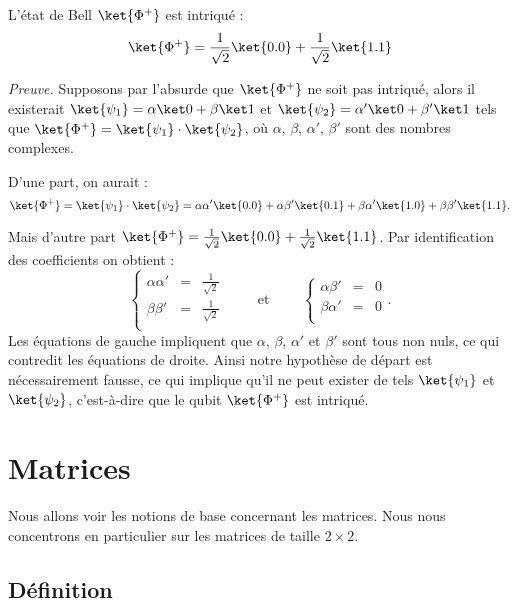 \documentclass[11pt,class=report,crop=false]{standalone}
\begin{document}
\begin{exemple}
L'état de Bell $\ket{\Phi^+}$ est intriqué :
$$\ket{\Phi^+} = \frac1{\sqrt2} \ket{0.0} + \frac1{\sqrt2} \ket{1.1}$$


\emph{Preuve.} Supposons par l'absurde que $\ket{\Phi^+}$ ne soit pas intriqué, alors il existerait 
$\ket{\psi_1}=\alpha\ket0+\beta\ket1$
et $\ket{\psi_2}=\alpha'\ket0+\beta'\ket1$
tels que $\ket{\Phi^+} = \ket{\psi_1} \cdot \ket{\psi_2}$, où $\alpha$, $\beta$, $\alpha'$, $\beta'$ sont des nombres complexes.

D'une part, on aurait :
$$\ket{\Phi^+} 
= \ket{\psi_1} \cdot \ket{\psi_2}
= \alpha\alpha'\ket{0.0} + \alpha\beta'\ket{0.1}
+ \beta\alpha'\ket{1.0} + \beta\beta'\ket{1.1} 
.$$

Mais d'autre part $\ket{\Phi^+} = \frac1{\sqrt2} \ket{0.0} + \frac1{\sqrt2} \ket{1.1}$.
Par identification des coefficients on obtient :
$$
\left\{\begin{array}{rcl}
\alpha\alpha' &=& \frac1{\sqrt2} \\
\beta\beta'&=& \frac1{\sqrt2}\\
\end{array}\right.
\qquad \text{ et   } \qquad
\left\{\begin{array}{rcl}
\alpha\beta'&=&0\\
\beta\alpha'&=&0\\
\end{array}\right..$$
Les équations de gauche impliquent que $\alpha$, $\beta$, $\alpha'$ et $\beta'$ sont tous non nuls, ce qui contredit les équations de droite.
Ainsi notre hypothèse de départ est nécessairement fausse, ce qui implique qu'il ne peut exister de tels $\ket{\psi_1}$ et $\ket{\psi_2}$, c'est-à-dire que le qubit $\ket{\Phi^+}$ est intriqué.
\end{exemple}


\section{Matrices}


Nous allons voir les notions de base concernant les matrices. 
Nous nous concentrons en particulier sur les matrices de taille $2\times 2$.

\subsection{Définition}
\end{document}
